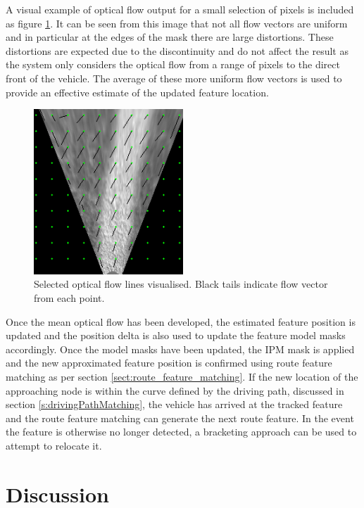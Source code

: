 \documentclass[]{aiaa-tc}%
\begin{document}
A visual example of optical flow output for a small selection of pixels is included as figure \ref{f:optical_flow_trails}. It can be seen from this image that not all flow vectors are uniform and in particular at the edges of the mask there are large distortions. These distortions are expected due to the discontinuity and do not affect the result as the system only considers the optical flow from a range of pixels to the direct front of the vehicle. The average of these more uniform flow vectors is used to provide an effective estimate of the updated feature location.


\begin{figure} %
	\centering
	\includegraphics[width=0.5\textwidth]{FeatureTracking/optical_flow_trails.png}
	\caption{Selected optical flow lines visualised. Black tails indicate flow vector from each point.}
	\label{f:optical_flow_trails}
\end{figure}

Once the mean optical flow has been developed, the estimated feature position is updated and the position delta is also used to update the feature model masks accordingly. Once the model masks have been updated, the IPM mask is applied and the new approximated feature position is confirmed using route feature matching as per section \ref{sect:route_feature_matching}. If the new location of the approaching node is within the curve defined by the driving path, discussed in section \ref{s:drivingPathMatching}, the vehicle has arrived at the tracked feature and the route feature matching can generate the next route feature. In the event the feature is otherwise no longer detected, a bracketing approach can be used to attempt to relocate it.

\section{Discussion}
\end{document}
